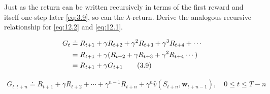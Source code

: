 
\begin{exercise}[Exercise 12.1]

Just as the return can be written recursively in terms of the first reward and itself one-step later \eqref{eq:3.9}, so can the $\lambda$-return.
Derive the analogous recursive relationship for \eqref{eq:12.2} and \eqref{eq:12.1}.

\end{exercise}


\begin{solution}

\begin{align}
    G_t
    & \doteq
    R_{t+1} + \gamma R_{t+2} + \gamma^2 R_{t+3} + \gamma^3 R_{t+4} + \cdots \notag \\
    & =
    R_{t+1} + \gamma (R_{t+2} + \gamma R_{t+3} + \gamma^2 R_{t+4} \cdots) \notag \\
    & =
    R_{t+1} + \gamma G_{t+1} \label{eq:3.9} \tag{3.9}
\end{align}

\begin{align} \label{eq:12.1} \tag{12.1}
    G_{t:t+n}
    \doteq
    R_{t+1} + \gamma R_{t+2} + \cdots + \gamma^{n-1} R_{t+n} + \gamma^n \hat v(S_{t+n}, \mathbf w_{t+n-1}),
    \quad
    0 \leq t \leq T - n
\end{align}


\end{solution}
